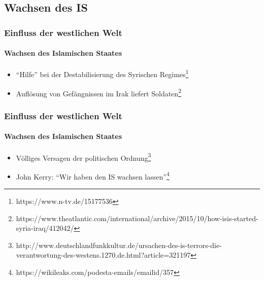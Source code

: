 \documentclass[10pt,a4paper]{beamer}
\newcommand{\ftn}[2]{\footnote[#1]{\tiny #2}}
\begin{document}
\subsection{Wachsen des IS}
\begin{frame}
\frametitle{Einfluss der westlichen Welt}
\framesubtitle{Wachsen des Islamischen Staates}
\begin{itemize}
\item \enquote{Hilfe} bei der Destabilisierung des Syrischen Regimes\ftn{1}{https://www.n-tv.de/15177536}
\pause
\item Auflösung von Gefängnissen im Irak liefert Soldaten\ftn{2}{ https://www.theatlantic.com/international/archive/2015/10/how-isis-started-syria-iraq/412042/}
\end{itemize}
\end{frame}

\begin{frame}
\frametitle{Einfluss der westlichen Welt}
\framesubtitle{Wachsen des Islamischen Staates}
\begin{itemize}
\item Völliges Versagen der politischen Ordnung\ftn{3}{http://www.deutschlandfunkkultur.de/ursachen-des-is-terrors-die-verantwortung-des-westens.1270.de.html?article=321197}
\pause  
\item John Kerry: \enquote{Wir haben den IS wachsen lassen}\ftn{4}{https://wikileaks.com/podesta-emails/emailid/357}
\end{itemize}
\end{frame}





\begin{frame}
\titlepage
\end{frame}
\end{document}
